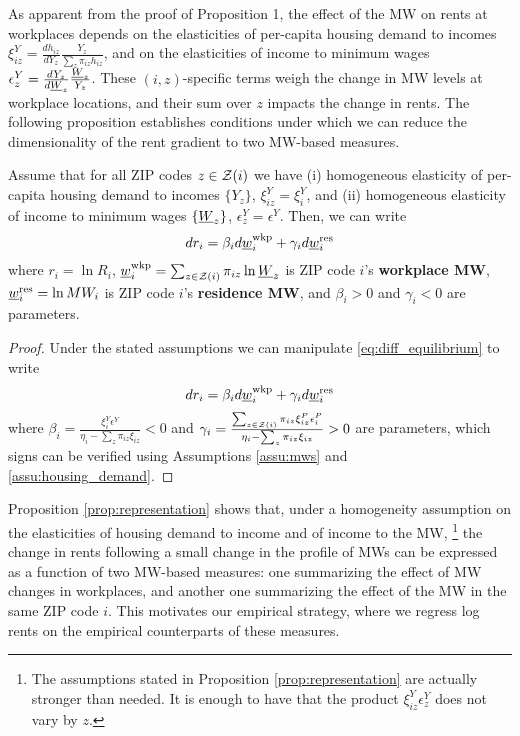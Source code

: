 As apparent from the proof of Proposition 1, the effect of the MW on rents
at workplaces depends on the elasticities of per-capita housing demand to incomes
$\xi^Y_{iz} = \frac{d h_{iz}}{d Y_z} \frac{Y_z}{\sum_z \pi_{iz} h_{iz}}$, and
on the elasticities of income to minimum wages
$\epsilon_z^Y = \frac{d Y_z}{d \underline{W}_z} \frac{\underline{W}_z}{Y_z}$.
These $(i,z)$-specific terms weigh the change in MW levels at workplace locations,
and their sum over $z$ impacts the change in rents.
The following proposition establishes conditions under which we can reduce the 
dimensionality of the rent gradient to two MW-based measures.

\begin{prop}[Representation]\label{prop:representation}
    Assume that for all ZIP codes $z\in\mathcal{Z}(i)$ we have
    (i) homogeneous elasticity of per-capita housing demand to incomes $\{Y_z\}$,
    $\xi^Y_{iz}=\xi^Y_{i}$, and
    (ii) homogeneous elasticity of income to minimum wages $\{\underline{W}_z\}$,
    $\epsilon_z^Y=\epsilon^Y$.
    Then, we can write
    $$
    d r_{i} = \beta_i d \underline{w}_{i}^{\text{wkp}} + \gamma_i d \underline{w}^{\text{res}}_i
    $$
    where 
    $r_{i} = \ln R_i$,
    $\underline{w}_{i}^{\text{wkp}} = \sum_{z\in\mathcal{Z}(i)} \pi_{iz} \ln \underline{W}_z$ 
    is ZIP code $i$'s \textbf{workplace MW}, 
    $\underline{w}^{\text{res}}_i = \ln MW_i$ 
    is ZIP code $i$'s \textbf{residence MW}, and 
    $\beta_i > 0$ and $\gamma_i < 0$ are parameters.
\end{prop}
\begin{proof}
    Under the stated assumptions we can manipulate \eqref{eq:diff_equilibrium} 
    to write
    \begin{equation} \label{eq:theory_representation}
        d r_i = \beta_i  d \underline{w}^{\text{wkp}}_i
              + \gamma_i d \underline{w}^{\text{res}}_i
    \end{equation}
    where
    $\beta_i = \frac{\xi_{i}^{Y}\epsilon^{Y}}
                     {\eta_{i} - \sum_z \pi_{iz} \xi_{iz}} 
              < 0$ and
    $\gamma_i = \frac{\sum_{z\in\mathcal{Z}(i)}\pi_{iz}\xi_{iz}^{P}\epsilon_{i}^{P}}
                    {\eta_{i} - \sum_z \pi_{iz} \xi_{iz}} 
              > 0$
    are parameters, which signs can be verified using
    Assumptions \ref{assu:mws} and \ref{assu:housing_demand}.
\end{proof}

Proposition \ref{prop:representation} shows that, under a homogeneity assumption
on the elasticities of housing demand to income and of income to the MW,%
\footnote{The assumptions stated in Proposition \ref{prop:representation} are 
actually stronger than needed.
It is enough to have that the product $\xi^Y_{iz} \epsilon_z^Y$ does not vary 
by $z$.}
the change in rents following a small change in the profile of MWs can be 
expressed as a function of two MW-based measures:
one summarizing the effect of MW changes in workplaces,
and another one summarizing the effect of the MW in the same ZIP code $i$.
This motivates our empirical strategy, where we regress log rents on the empirical
counterparts of these measures.

